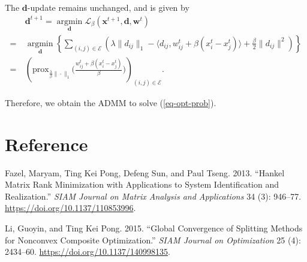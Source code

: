 \documentclass[
  letterpaper,
  DIV=11,
  numbers=noendperiod]{scrartcl}
\newlength{\cslhangindent}
\newenvironment{CSLReferences}[2] %
 {\begin{list}{}{%
  \setlength{\itemindent}{0pt}
  \setlength{\leftmargin}{0pt}
  \setlength{\parsep}{0pt}
  \ifodd #1
   \setlength{\leftmargin}{\cslhangindent}
   \setlength{\itemindent}{-1\cslhangindent}
  \fi
  \setlength{\itemsep}{#2\baselineskip}}}
 {\end{list}}
\theoremstyle{plain}
\theoremstyle{remark}
\begin{document}
The \(\mathbf{d}\)-update remains unchanged, and is given by \[
\begin{aligned}
  & ~\mathbf{d}^{t+1} = \operatorname*{argmin}_{\mathbf{d}} \mathcal{L}_{\beta}(\mathbf{x}^{t+1}, \mathbf{d}, \mathbf{w}^t) \\
  = &~\operatorname*{argmin}_{\mathbf{d}} \left\{ \sum_{(i, j) \in \mathcal{E}} \left(\lambda \| d_{ij} \|_1 - \langle d_{ij}, w_{ij}^t + \beta (x_i^t - x_j^t) \rangle + \frac{\beta}{2} \| d_{ij} \|^2 \right) \right\} \\
  = &~\left( \textrm{prox}_{\frac{\lambda}{\beta}\| \cdot \|_1} \Big( \frac{w_{ij}^t + \beta (x_i^t - x_j^t)}{\beta} \Big) \right)_{(i, j) \in \mathcal{E}}.
\end{aligned}
\]

Therefore, we obtain the ADMM to solve (\ref{eq-opt-prob}).

\section*{Reference}\label{reference}

\label{refs}
\begin{CSLReferences}{1}{0}
Fazel, Maryam, Ting Kei Pong, Defeng Sun, and Paul Tseng. 2013.
{``Hankel Matrix Rank Minimization with Applications to System
Identification and Realization.''} \emph{SIAM Journal on Matrix Analysis
and Applications} 34 (3): 946--77.
\url{https://doi.org/10.1137/110853996}.

Li, Guoyin, and Ting Kei Pong. 2015. {``Global Convergence of Splitting
Methods for Nonconvex Composite Optimization.''} \emph{SIAM Journal on
Optimization} 25 (4): 2434--60. \url{https://doi.org/10.1137/140998135}.

\end{CSLReferences}
\end{document}
